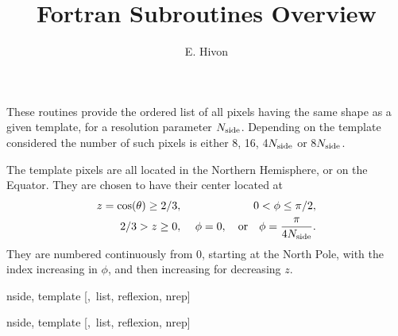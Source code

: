 
\sloppy


\title{\healpix Fortran Subroutines Overview}
 \section[same\_shape\_pixels\_nest, same\_shape\_pixels\_ring]{ }
\label{sub:same_shape_pixels_xxx}
\author{E. Hivon}

\begin{facility}
{These routines provide the ordered list of all \healpix pixels having the same shape
  as a given template, for a resolution parameter ${N_{\rm side}}$. Depending on the
  template considered the number of such pixels is either 8, 16, 4${N_{\rm side}}$ or
  8${N_{\rm side}}$.


The template pixels are all located in the Northern Hemisphere, or on the
 Equator.
They are chosen to have their center located at
\begin{eqnarray}
     z=\cos(\theta)\ge 2/3,  &\ &    0< \phi \leq \pi/2,   \nonumber\\            %
     2/3 > z \geq 0,  &\ & \phi=0, \quad{\rm or}\quad  \phi=\frac{\pi}{4\nside}.  \nonumber %
\myhtmlimage{}
\end{eqnarray}
 They are numbered continuously from 0, starting at the North Pole, with the index
 increasing in $\phi$, and then increasing for decreasing $z$.
}
{\modPixTools}
\end{facility}

\begin{f90format}
{ nside, template [,~list, reflexion, nrep]}
\end{f90format}
\begin{f90format}
{ nside, template [,~list, reflexion, nrep]}
\end{f90format}

